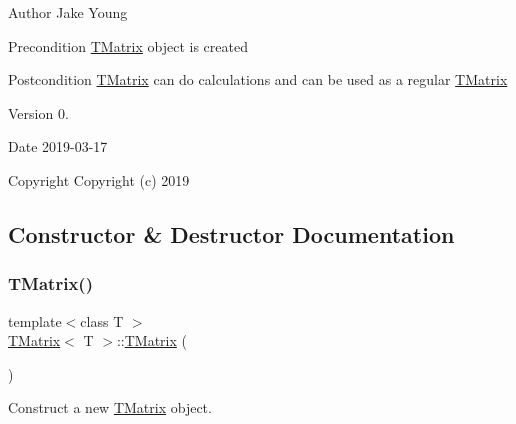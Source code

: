 \begin{DoxyAuthor}{Author}
Jake Young 
\end{DoxyAuthor}
\begin{DoxyPrecond}{Precondition}
\mbox{\hyperlink{class_t_matrix}{T\+Matrix}} object is created 
\end{DoxyPrecond}
\begin{DoxyPostcond}{Postcondition}
\mbox{\hyperlink{class_t_matrix}{T\+Matrix}} can do calculations and can be used as a regular \mbox{\hyperlink{class_t_matrix}{T\+Matrix}} 
\end{DoxyPostcond}
\begin{DoxyVersion}{Version}
0. 
\end{DoxyVersion}
\begin{DoxyDate}{Date}
2019-\/03-\/17
\end{DoxyDate}
\begin{DoxyCopyright}{Copyright}
Copyright (c) 2019 
\end{DoxyCopyright}


\subsection{Constructor \& Destructor Documentation}
\mbox{\label{class_t_matrix_a50886f4101ccedbddc89973133daa625}} 
\subsubsection{\texorpdfstring{TMatrix()}{TMatrix()}\hspace{0.1cm}{\footnotesize\ttfamily [1/4]}}
{\footnotesize\ttfamily template$<$class T $>$ \\
\mbox{\hyperlink{class_t_matrix}{T\+Matrix}}$<$ T $>$\+::\mbox{\hyperlink{class_t_matrix}{T\+Matrix}} (\begin{DoxyParamCaption}{ }\end{DoxyParamCaption})}



Construct a new \mbox{\hyperlink{class_t_matrix}{T\+Matrix}} object. 

\mbox{\label{class_t_matrix_a183b5ca8ae02017d5879675727681ee5}} 
